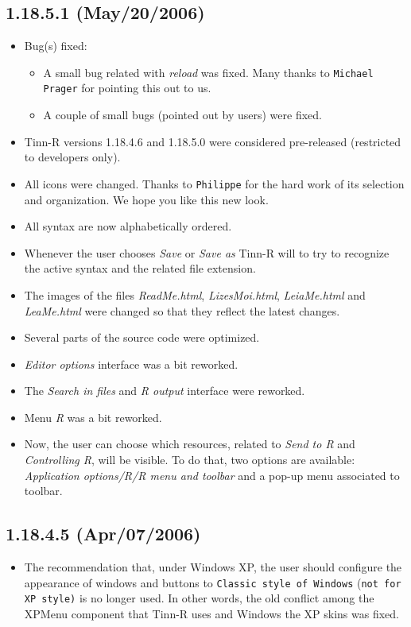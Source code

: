 \subsection*{1.18.5.1 (May/20/2006)}
\begin{itemize}
  \item Bug(s) fixed:
    \begin{itemize}
      \item A small bug related with \textit{reload} was fixed. Many
        thanks to \texttt{Michael Prager} for pointing this out to us.
      \item A couple of small bugs (pointed out by users) were fixed.
    \end{itemize}
  \item Tinn-R versions 1.18.4.6 and 1.18.5.0 were considered pre-released
    (restricted to developers only).
  \item All icons were changed. Thanks to \texttt{Philippe} for the hard
    work of its selection and organization. We hope you like this new look.
  \item All syntax are now alphabetically ordered.
  \item Whenever the user chooses \textit{Save} or \textit{Save as}
    Tinn-R will to try to recognize the active syntax and the related file
    extension.
  \item The images of the files \textit{ReadMe.html}, \textit{LizesMoi.html},
    \textit{LeiaMe.html} and \textit{LeaMe.html} were changed so that they
    reflect the latest changes.
  \item Several parts of the source code were optimized.
  \item \textit{Editor options} interface was a bit reworked.
  \item The \textit{Search in files} and \textit{R output} interface were
    reworked.
  \item Menu \textit{R} was a bit reworked.
  \item Now, the user can choose which \RR{} resources, related to
    \textit{Send to R} and \textit{Controlling R}, will be visible.
    To do that, two options are available:
    \textit{Application options/R/R menu and toolbar} and a pop-up
    menu associated to \RR{} toolbar.
\end{itemize}


\subsection*{1.18.4.5 (Apr/07/2006)}
\begin{itemize}
  \item The recommendation that, under Windows XP, the user should configure the
    appearance of windows and buttons to \texttt{Classic style of Windows}
    (\texttt{not for XP style)} is no longer used. In other words,
    the old conflict among the XPMenu component that Tinn-R uses and Windows
    the XP skins was fixed.
\end{itemize}


